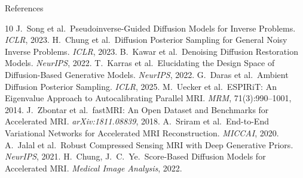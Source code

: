 \documentclass[aspectratio=169]{beamer}
\begin{document}
\begin{frame}[allowframebreaks]{References}
  \scriptsize
  \begin{thebibliography}{10}
      J.~Song et al.\ Pseudoinverse-Guided Diffusion Models for Inverse Problems. \emph{ICLR}, 2023.
      H.~Chung et al.\ Diffusion Posterior Sampling for General Noisy Inverse Problems. \emph{ICLR}, 2023.
      B.~Kawar et al.\ Denoising Diffusion Restoration Models. \emph{NeurIPS}, 2022.
      T.~Karras et al.\ Elucidating the Design Space of Diffusion-Based Generative Models. \emph{NeurIPS}, 2022.
      G.~Daras et al.\ Ambient Diffusion Posterior Sampling. \emph{ICLR}, 2025.
      M.~Uecker et al.\ ESPIRiT: An Eigenvalue Approach to Autocalibrating Parallel MRI. \emph{MRM}, 71(3):990--1001, 2014.
      J.~Zbontar et al.\ fastMRI: An Open Dataset and Benchmarks for Accelerated MRI. \emph{arXiv:1811.08839}, 2018.
      A.~Sriram et al.\ End-to-End Variational Networks for Accelerated MRI Reconstruction. \emph{MICCAI}, 2020.
      A.~Jalal et al.\ Robust Compressed Sensing MRI with Deep Generative Priors. \emph{NeurIPS}, 2021.
      H.~Chung, J.~C.~Ye.\ Score-Based Diffusion Models for Accelerated MRI. \emph{Medical Image Analysis}, 2022.
  \end{thebibliography}
\end{frame}
\end{document}
